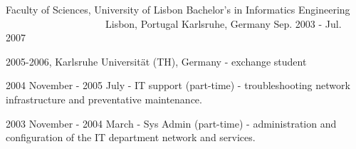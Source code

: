 \begin{cventries}

  \cventry
    {Faculty of Sciences, University of Lisbon} %
    {Bachelor's in Informatics Engineering} %
    {~~~~~~~~~~~~~~~~~~~~Lisbon, Portugal Karlsruhe, Germany} %
    {Sep. 2003 - Jul. 2007} %
    {
      \begin{cvitems} %
        \item {2005-2006, Karlsruhe Universität (TH), Germany - exchange student}
		\item {2004 November - 2005 July - IT support (part-time) - troubleshooting network infrastructure and preventative maintenance.}
		\item {2003 November - 2004 March - Sys Admin (part-time) - administration and configuration of the IT department network and services.}
      \end{cvitems}
    }

	
	

\end{cventries}
